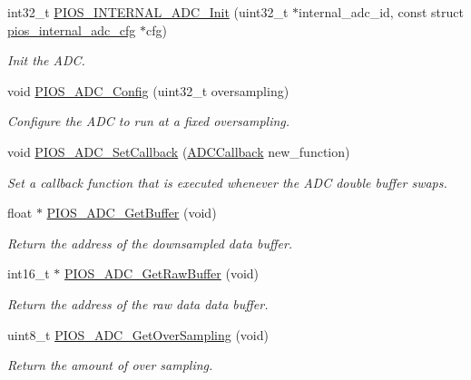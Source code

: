 \begin{DoxyCompactItemize}
int32\-\_\-t \hyperlink{group___p_i_o_s___a_d_c_ga24dec792533e0f27e35c3ea6d1bbd9e1}{\-P\-I\-O\-S\-\_\-\-I\-N\-T\-E\-R\-N\-A\-L\-\_\-\-A\-D\-C\-\_\-\-Init} (uint32\-\_\-t $\ast$internal\-\_\-adc\-\_\-id, const struct \hyperlink{structpios__internal__adc__cfg}{pios\-\_\-internal\-\_\-adc\-\_\-cfg} $\ast$cfg)
\begin{DoxyCompactList}\small\item\em \-Init the \-A\-D\-C. \end{DoxyCompactList}\item 
void \hyperlink{group___p_i_o_s___a_d_c_ga0edf09afa78da740bb49069ee8221b5c}{\-P\-I\-O\-S\-\_\-\-A\-D\-C\-\_\-\-Config} (uint32\-\_\-t oversampling)
\begin{DoxyCompactList}\small\item\em \-Configure the \-A\-D\-C to run at a fixed oversampling. \end{DoxyCompactList}\item 
void \hyperlink{group___p_i_o_s___a_d_c_gaba0959952db7ff67364a28ea801c41ec}{\-P\-I\-O\-S\-\_\-\-A\-D\-C\-\_\-\-Set\-Callback} (\hyperlink{group___p_i_o_s___i_n_t_e_r_n_a_l___a_d_c_ga20bf90833813c2c4945fab90c8e4f386}{\-A\-D\-C\-Callback} new\-\_\-function)
\begin{DoxyCompactList}\small\item\em \-Set a callback function that is executed whenever the \-A\-D\-C double buffer swaps. \end{DoxyCompactList}\item 
float $\ast$ \hyperlink{group___p_i_o_s___a_d_c_ga3684039dd2c7b58018d93552371651d3}{\-P\-I\-O\-S\-\_\-\-A\-D\-C\-\_\-\-Get\-Buffer} (void)
\begin{DoxyCompactList}\small\item\em \-Return the address of the downsampled data buffer. \end{DoxyCompactList}\item 
int16\-\_\-t $\ast$ \hyperlink{group___p_i_o_s___a_d_c_gaa72293956e8aaea48593f2d80ae9d9d2}{\-P\-I\-O\-S\-\_\-\-A\-D\-C\-\_\-\-Get\-Raw\-Buffer} (void)
\begin{DoxyCompactList}\small\item\em \-Return the address of the raw data data buffer. \end{DoxyCompactList}\item 
uint8\-\_\-t \hyperlink{group___p_i_o_s___a_d_c_gaa343a6f620ddd80259e92ff0595cf977}{\-P\-I\-O\-S\-\_\-\-A\-D\-C\-\_\-\-Get\-Over\-Sampling} (void)
\begin{DoxyCompactList}\small\item\em \-Return the amount of over sampling. \end{DoxyCompactList}\item 

\end{DoxyCompactItemize}

